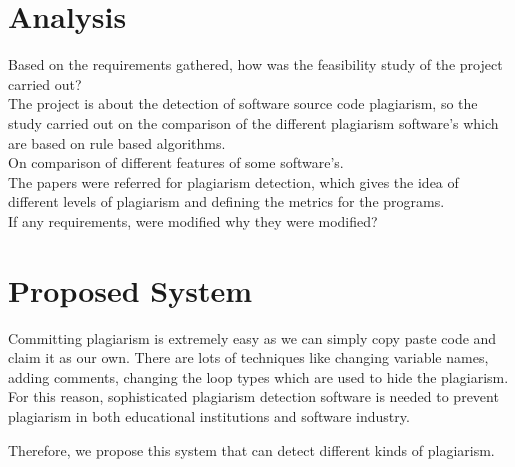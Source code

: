 		\section{Analysis}
		
		Based on the requirements gathered, how was the feasibility study of the project carried out? \\
		The project is about the detection of software source code plagiarism, so the study carried out on the comparison of the different plagiarism software's which are based on rule based algorithms.\\
		On comparison of different features of some software's.\\
		The papers were referred for plagiarism detection, which gives the idea of different levels of plagiarism and defining the metrics for the programs.  \\
		If any requirements, were modified why they were modified? \\
		
		
		\section{Proposed System}
		
		Committing plagiarism is extremely easy as we can simply copy paste code and claim it as our own. There are lots of techniques like changing variable names, adding comments, changing the loop types which are used to hide the plagiarism. For this reason, sophisticated plagiarism detection software is needed to prevent plagiarism in both educational institutions and software industry. 
		
		Therefore, we propose this system that can detect different kinds of plagiarism. 
		
